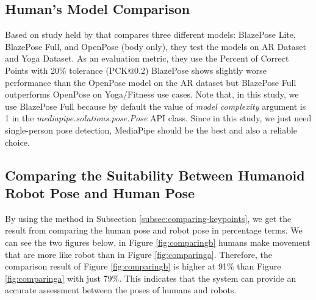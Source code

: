 \subsection{Human's Model Comparison}
\label{subsec:humanmodelcomparison}

Based on study held by \citet{bazarevsky2020} that compares three different models: BlazePose Lite, BlazePose Full, and OpenPose (body only), they test the models on AR Dataset and Yoga Dataset. As an evaluation metric, they use the Percent of Correct Points with 20\% tolerance (PCK@0.2)
BlazePose shows slightly worse performance than the OpenPose model on the AR dataset but BlazePose Full outperforms OpenPose on Yoga/Fitness use cases.
Note that, in this study, we use BlazePose Full because by default the value of \emph{model complexity} argument is 1 in the \emph{mediapipe.solutions.pose.Pose} API class.
Since in this study, we just need single-person pose detection, MediaPipe should be the best and also a reliable choice.

\subsection{Comparing the Suitability Between Humanoid Robot Pose and Human Pose}
\label{subsec:comparingsuitability}

By using the method in Subsection \ref{subsec:comparing-keypoints}, we get the result from comparing the human pose and robot pose in percentage terms.
We can see the two figures below, in Figure \ref{fig:comparingb} humans make movement that are more like robot than in Figure \ref{fig:comparinga}.
Therefore, the comparison result of Figure \ref{fig:comparingb} is higher at 91\% than Figure \ref{fig:comparinga} with just 79\%.
This indicates that the system can provide an accurate assessment between the poses of humans and robots.

